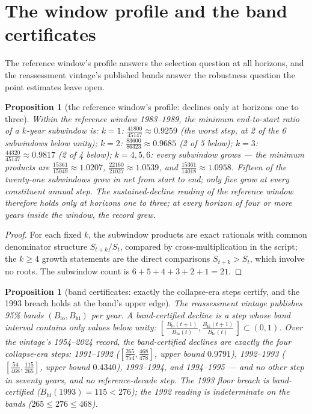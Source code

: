 \documentclass[10pt,twocolumn]{article}
\theoremstyle{plain}
\newtheorem{proposition}[theorem]{Proposition}
\theoremstyle{remark}
\begin{document}
\section{The window profile and the band certificates}\label{profile}

The reference window's profile answers the selection question at all
horizons, and the reassessment vintage's published bands answer the
robustness question the point estimates leave open.

\begin{proposition}[the reference window's profile: declines only at
horizons one to three]\label{prop:profile}
Within the reference window 1983--1989, the minimum end-to-start ratio
of a \(k\)-year subwindow is: \(k=1\):
\(\tfrac{41800}{45147} \approx 0.9259\) (the worst step, at 2 of the 6
subwindows below unity); \(k=2\): \(\tfrac{83600}{86323} \approx
0.9685\) (2 of 5 below); \(k=3\): \(\tfrac{44320}{45147} \approx
0.9817\) (2 of 4 below); \(k = 4, 5, 6\): every subwindow grows ---
the minimum products are \(\tfrac{15361}{15049} \approx 1.0207\),
\(\tfrac{22160}{21027} \approx 1.0539\), and
\(\tfrac{15361}{14018} \approx 1.0958\). Fifteen of the twenty-one
subwindows grow in net from start to end; only five grow at
every constituent annual step. The sustained-decline
reading of the reference window therefore holds only at horizons one
to three; at every horizon of four or more years inside the window,
the record grew.
\end{proposition}

\begin{proof}
For each fixed \(k\), the subwindow products are exact rationals with
common denominator structure \(S_{t+k}/S_t\), compared by
cross-multiplication in the script; the \(k \ge 4\) growth statements
are the direct comparisons \(S_{t+k} > S_t\), which involve no roots.
The subwindow count is \(6+5+4+3+2+1 = 21\).
\end{proof}

\begin{proposition}[band certificates: exactly the collapse-era steps
certify, and the 1993 breach holds at the band's upper edge]
\label{prop:bands}
The reassessment vintage publishes 95\% bands \((B_{\mathrm{lo}},
B_{\mathrm{hi}})\) per year. A band-certified decline is a step whose
band interval contains only values below unity:
\([\,\tfrac{B_{\mathrm{lo}}(t+1)}{B_{\mathrm{hi}}(t)},
\tfrac{B_{\mathrm{hi}}(t+1)}{B_{\mathrm{lo}}(t)}\,] \subset (0,1)\).
Over the vintage's 1954--2024 record, the band-certified declines are
exactly the four collapse-era steps: 1991--1992
(\([\tfrac{265}{754}, \tfrac{468}{478}]\), upper bound \(0.9791\)),
1992--1993 (\([\tfrac{54}{468}, \tfrac{115}{265}]\), upper bound
\(0.4340\)), 1993--1994, and 1994--1995 --- and no other step in
seventy years, and no reference-decade step. The 1993 floor breach is
band-certified (\(B_{\mathrm{hi}}(1993) = 115 < 276\)); the 1992
reading is indeterminate on the bands (\(265 \le 276 \le 468\)).
\end{proposition}
\end{document}
